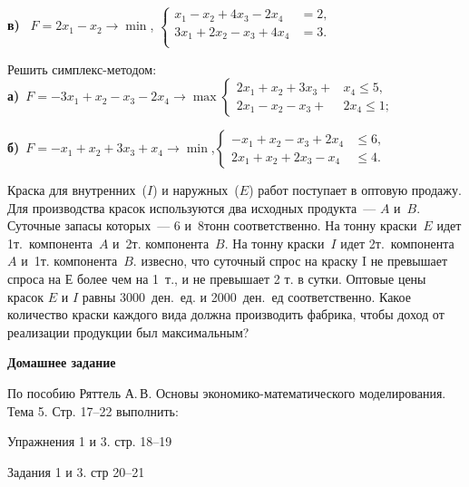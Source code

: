 \documentclass[a5paper,11pt]{extarticle}
\begin{document}
\begin{enumerate}
\textbf{в)}~%
$F=2x_{1}-x_{2} \to \min$,\quad
$
\left\lbrace
\begin{aligned}
  x_1-x_2+4x_3-2x_4&=2,\\
  3x_1+2x_2-x_3+4x_4&=3.\\
\end{aligned}
\right.
$




  \item 
  	Решить симплекс-методом:\\
  \textbf{а)}~$F  = -3x_1 + x_2 - x_3 - 2x_4  \to \max$\quad $
  \left\lbrace\begin{aligned}
    2x_1 + x_2 + 3x_3 + &x_4 \leqslant 5,\\
    2x_1 - x_2 - x_3 + &2x_4 \leqslant 1;
  \end{aligned}\right.
  $ 
  
  \textbf{б)}~$F = -x_1 +x_2 + 3x_3 +x_4  \to \min$,\quad $
  \left\lbrace\begin{aligned}
  -x_1 + x_2 - x_3 + 2x_4 &\leqslant 6,\\
  2x_1 + x_2 + 2x_3 - x_4 &\leqslant 4.
  \end{aligned}\right.
  $
\item
	 Краска для внутренних~($I$) и наружных~($E$) работ поступает в оптовую продажу. Для производства красок используются два исходных продукта~--- $A$ и~$B$. Суточные запасы которых~--- 6 и~8\;тонн соответственно. 
На тонну краски~$E$ идет 1\;т.~компонента~$A$ и~2\;т. компонента~$B$.
На тонну краски~$I$ идет 2\;т.~компонента~$A$ и~1\;т. компонента~$B$.
извесно, что суточный спрос на краску I не превышает спроса на Е более чем на 1~т., и не превышает 2 т. в сутки. 
Оптовые цены красок $E$ и $I$  равны 3000~ден.~ед. и 2000~ден.~ед соответственно. Какое количество краски каждого вида должна производить фабрика, чтобы доход от реализации продукции был максимальным?
\medskip
{\item[] \centering \bfseries Домашнее задание\par}
По пособию Ряттель А.\,В. Основы экономико-математического моделирования. Тема 5. Стр. 17--22 выполнить: 
\item Упражнения 1 и 3. стр. 18--19
\item Задания 1 и 3. стр 20--21


\end{enumerate}
\end{document}

